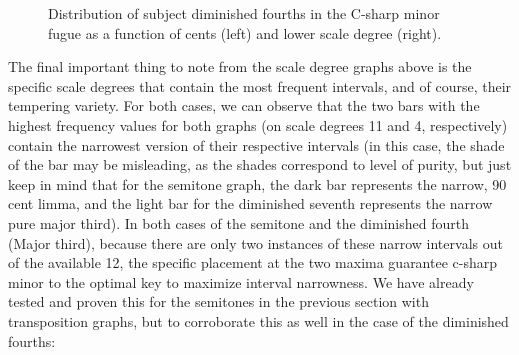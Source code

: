 \begin{figure}[H]
\vspace{1.5em}
    \centering
    \caption[Distribution of subject diminished fourths in the C-sharp minor fugue as a function of cents and lower scale degree. ]{Distribution of subject diminished fourths in the C-sharp minor fugue as a function of cents (left) and lower scale degree (right).}
\end{figure}    The final important thing to note from the scale degree graphs above is
the specific scale degrees that contain the most frequent intervals, and
of course, their tempering variety. For both cases, we can observe that
the two bars with the highest frequency values for both graphs (on scale
degrees 11 and 4, respectively) contain the narrowest version of their
respective intervals (in this case, the shade of the bar may be
misleading, as the shades correspond to level of purity, but just keep
in mind that for the semitone graph, the dark bar represents the narrow,
90 cent limma, and the light bar for the diminished seventh represents
the narrow pure major third). In both cases of the semitone and the
diminished fourth (Major third), because there are only two instances of
these narrow intervals out of the available 12, the specific placement
at the two maxima guarantee c-sharp minor to the optimal key to maximize
interval narrowness. We have already tested and proven this for the
semitones in the previous section with transposition graphs, but to
corroborate this as well in the case of the diminished fourths:



